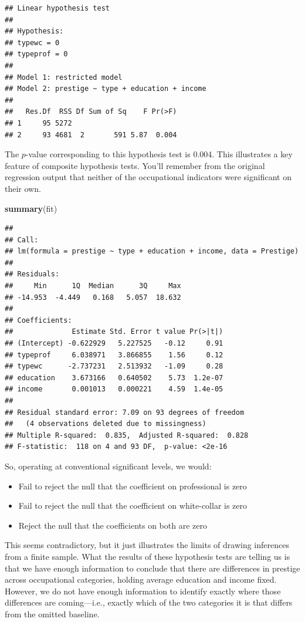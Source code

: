 \documentclass[12pt,oneside,openany]{book}
\newenvironment{Shaded}{\begin{snugshade}}{\end{snugshade}}
\newcommand{\KeywordTok}[1]{\textcolor[rgb]{0.13,0.29,0.53}{\textbf{#1}}}
\newcommand{\NormalTok}[1]{#1}
\providecommand{\tightlist}{%
  \setlength{\itemsep}{0pt}\setlength{\parskip}{0pt}}
\begin{document}
\begin{verbatim}
## Linear hypothesis test
## 
## Hypothesis:
## typewc = 0
## typeprof = 0
## 
## Model 1: restricted model
## Model 2: prestige ~ type + education + income
## 
##   Res.Df  RSS Df Sum of Sq    F Pr(>F)
## 1     95 5272                         
## 2     93 4681  2       591 5.87  0.004
\end{verbatim}

The \(p\)-value corresponding to this hypothesis test is 0.004. This
illustrates a key feature of composite hypothesis tests. You'll remember
from the original regression output that neither of the occupational
indicators were significant on their own.

\begin{Shaded}
\begin{Highlighting}[]
\KeywordTok{summary}\NormalTok{(fit)}
\end{Highlighting}
\end{Shaded}

\begin{verbatim}
## 
## Call:
## lm(formula = prestige ~ type + education + income, data = Prestige)
## 
## Residuals:
##     Min      1Q  Median      3Q     Max 
## -14.953  -4.449   0.168   5.057  18.632 
## 
## Coefficients:
##              Estimate Std. Error t value Pr(>|t|)
## (Intercept) -0.622929   5.227525   -0.12     0.91
## typeprof     6.038971   3.866855    1.56     0.12
## typewc      -2.737231   2.513932   -1.09     0.28
## education    3.673166   0.640502    5.73  1.2e-07
## income       0.001013   0.000221    4.59  1.4e-05
## 
## Residual standard error: 7.09 on 93 degrees of freedom
##   (4 observations deleted due to missingness)
## Multiple R-squared:  0.835,  Adjusted R-squared:  0.828 
## F-statistic:  118 on 4 and 93 DF,  p-value: <2e-16
\end{verbatim}

So, operating at conventional significant levels, we would:

\begin{itemize}
\tightlist
\item
  Fail to reject the null that the coefficient on professional is zero
\item
  Fail to reject the null that the coefficient on white-collar is zero
\item
  Reject the null that the coefficients on both are zero
\end{itemize}

This seems contradictory, but it just illustrates the limits of drawing
inferences from a finite sample. What the results of these hypothesis
tests are telling us is that we have enough information to conclude that
there are differences in prestige across occupational categories,
holding average education and income fixed. However, we do not have
enough information to identify exactly where those differences are
coming---i.e., exactly which of the two categories it is that differs
from the omitted baseline.
\end{document}
